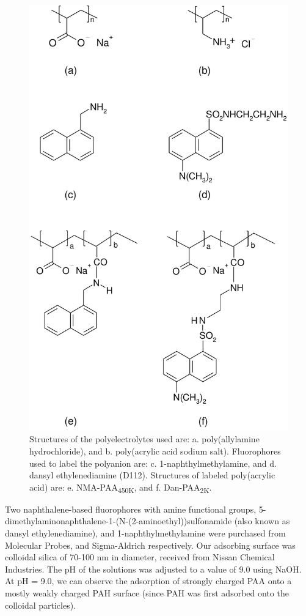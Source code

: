 \documentclass[journal=mamobx,manuscript=article]{achemso}
\begin{document}
\begin{figure}[H]
    \includegraphics[scale=0.25]{allChems_30apr2020.pdf}
    \caption{Structures of the polyelectrolytes used are: a. poly(allylamine hydrochloride), and b. poly(acrylic acid sodium salt).  Fluorophores used to label the polyanion are: c. 1-naphthylmethylamine, and d. dansyl ethylenediamine (D112).  Structures of labeled poly(acrylic acid) are: e. NMA-PAA\textsubscript{450K}, and f. Dan-PAA\textsubscript{2K}. }
    \label{figure 1}
\end{figure}


Two naphthalene-based fluorophores with amine functional groups, 5-dimethylaminonaphthalene-1-(N-(2-aminoethyl))sulfonamide (also known as dansyl ethylenediamine), and 1-naphthylmethylamine were purchased from Molecular Probes, and Sigma-Aldrich respectively.  Our adsorbing surface was colloidal silica of 70-100 nm in diameter, received from Nissan Chemical Industries. The pH of the solutions was adjusted to a value of 9.0 using NaOH.  At pH = 9.0, we can observe the adsorption of strongly charged PAA onto a mostly weakly charged PAH surface (since PAH was first adsorbed onto the colloidal particles).
\end{document}
